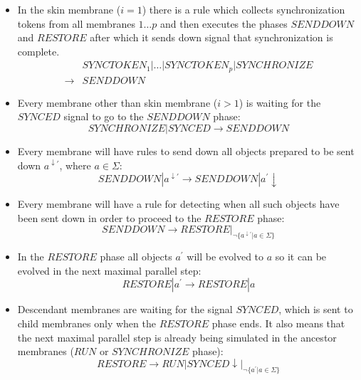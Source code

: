 \begin{dokaz}
\begin{itemize}
    \item In the skin membrane ($i=1$) there is a rule which collects synchronization tokens from all membranes $1\dots p$ and then executes the phases $\mathit{SENDDOWN}$ and $\mathit{RESTORE}$ after which it sends down signal that synchronization is complete.
    \begin{align*}
      &\mathit{SYNCTOKEN_1}|\dots|\mathit{SYNCTOKEN_p}|\mathit{SYNCHRONIZE} \\
      \rightarrow &\mathit{SENDDOWN}
    \end{align*}

    \item Every membrane other than skin membrane ($i>1$) is waiting for the $\mathit{SYNCED}$ signal to go to the $\mathit{SENDDOWN}$ phase:
    $$\mathit{SYNCHRONIZE}|\mathit{SYNCED} \rightarrow \mathit{SENDDOWN}$$

    \item Every membrane will have rules to send down all objects prepared to be sent down $a^{\downarrow\prime}$, where $a\in \Sigma$:
    $$\mathit{SENDDOWN}|a^{\downarrow\prime} \rightarrow \mathit{SENDDOWN}|a^{\prime}\downarrow$$

    \item Every membrane will have a rule for detecting when all such objects have been sent down in order to proceed to the $\mathit{RESTORE}$ phase:
    $$\mathit{SENDDOWN} \rightarrow \mathit{RESTORE}|_{\neg \{a^{\downarrow\prime}|a\in\Sigma\}}$$

    \item In the $\mathit{RESTORE}$ phase all objects $a^{\prime}$ will be evolved to $a$ so it can be evolved in the next maximal parallel step:
    $$\mathit{RESTORE}|a^{\prime} \rightarrow \mathit{RESTORE}|a$$

    \item Descendant membranes are waiting for the signal $\mathit{SYNCED}$, which is sent to child membranes only when the $\mathit{RESTORE}$ phase ends. It also means that the next maximal parallel step is already being simulated in the ancestor membranes ($\mathit{RUN}$ or $\mathit{SYNCHRONIZE}$ phase):
    $$\mathit{RESTORE} \rightarrow \mathit{RUN}|\mathit{SYNCED}\downarrow|_{\neg \{a^{\prime}|a\in\Sigma\}}$$
  \end{itemize}

  \providecommand{\narrow}[1]{\scalebox{.85}[1.0]{#1}}


\end{dokaz}
